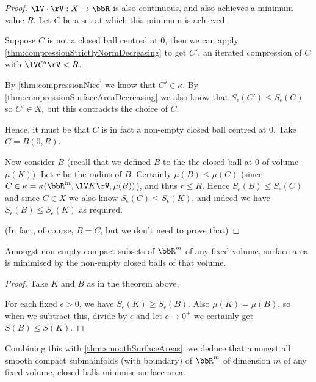 \documentclass[a4paper,11pt]{article}
\begin{document}
\begin{proof}
$\lV\cdot\rV:X\to\bbR$ is also continuous, and also achieves a minimum value
$R$.  Let $C$ be a set at which this minimum is achieved.

Suppose $C$ is not a closed ball centred at $0$, then we can apply
\ref{thm:compressionStrictlyNormDecreasing} to get $C'$, an iterated
compression of $C$ with $\lV C'\rV<R$.

By \ref{thm:compressionNice} we know that $C'\in\kappa$.
By \ref{thm:compressionSurfaceAreaDecreasing} we also know that
$S_\epsilon(C')\leq S_\epsilon(C)$ so $C'\in X$, but this contradcts the choice
of $C$.

Hence, it must be that $C$ is in fact a non-empty closed ball centred at $0$.
Take $C=B(0,R)$.

Now consider $B$ (recall that we defined $B$ to the the closed ball at $0$ of
volume $\mu(K)$).  Let $r$ be the radius of $B$.  Certainly $\mu(B)\leq\mu(C)$
(since $C\in\kappa=\kappa(\bbR^m,\lV K\rV,\mu(B))$), and thus
$r\leq R$.  Hence $S_\epsilon(B)\leq S_\epsilon(C)$ and since $C\in X$ we also
know $S_\epsilon(C)\leq S_\epsilon(K)$, and indeed we have
$S_\epsilon(B)\leq S_\epsilon(K)$ as required.

(In fact, of course, $B=C$, but we don't need to prove that)
\end{proof}

\begin{corollary}
Amongst non-empty compact subsets of $\bbR^m$ of any fixed volume, surface area
is minimised by the non-empty closed balls of that volume.
\end{corollary}

\begin{proof}
Take $K$ and $B$ as in the theorem above.

For each fixed $\epsilon>0$, we have $S_\epsilon(K)\geq S_\epsilon(B)$.  Also
$\mu(K)=\mu(B)$, so when we subtract this, divide by $\epsilon$
and let $\epsilon\to0^+$ we certainly
get $S(B)\leq S(K)$.
\end{proof}

\begin{corollary}
Combining this with \ref{thm:smoothSurfaceAreas}, we deduce that amongst all
smooth compact submainfolds (with boundary) of $\bbR^m$ of dimension $m$ of any
fixed volume, closed balls minimise surface area.
\end{corollary}

\end{document}
